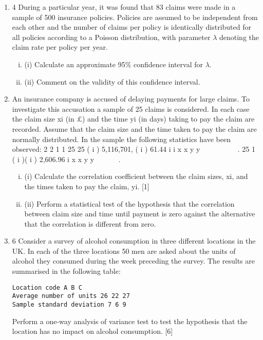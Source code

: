 \documentclass[a4paper,12pt]{article}
\begin{document}
\begin{enumerate}


  
\item 4 During a particular year, it was found that 83 claims were made in a sample of 500 insurance policies. Policies are assumed to be independent from each other and the number of claims per policy is identically distributed for all policies according to a Poisson distribution, with parameter $\lambda$ denoting the claim rate per policy per year.
\begin{enumerate}[(i)]
\item (i) Calculate an approximate 95\% confidence interval for $\lambda$. 
\item (ii) Comment on the validity of this confidence interval. 
\end{enumerate}
 \item  
An insurance company is accused of delaying payments for large claims. To investigate this accusation a sample of 25 claims is considered. In each case the claim size xi (in £) and the time yi (in days) taking to pay the claim are recorded.
Assume that the claim size and the time taken to pay the claim are normally distributed. In the sample the following statistics have been observed:
  2 2
1 1
25 25
( i ) 5,116,701, ( i ) 61.44
i i
x x y y
 
      .
25
1
( i )( i ) 2,606.96
i
x x y y

    .
\begin{enumerate}[(i)]
\item (i) Calculate the correlation coefficient between the claim sizes, xi, and the times taken to pay the claim, yi. [1]
\item (ii) Perform a statistical test of the hypothesis that the correlation between claim size and time until payment is zero against the alternative that the correlation is different from zero. 
\end{enumerate}

\item 6 Consider a survey of alcohol consumption in three different locations in the UK. In
each of the three locations 50 men are asked about the units of alcohol they
consumed during the week preceding the survey. The results are summarised in the
following table:

\begin{verbatim}
Location code A B C
Average number of units 26 22 27
Sample standard deviation 7 6 9
\end{verbatim}
Perform a one-way analysis of variance test to test the hypothesis that the location has no impact on alcohol consumption. [6]
\end{enumerate}
\newpage
\end{document}
